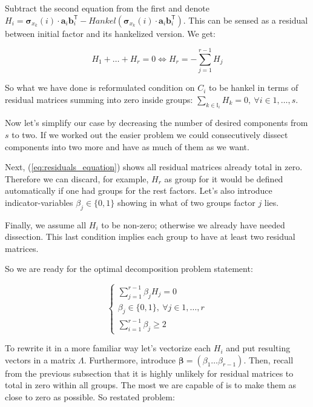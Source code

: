 \documentclass[referee, pdflatex]{sn-jnl}
\theoremstyle{definition}
\theoremstyle{plain}
\begin{document}
	Subtract the second equation from the first and denote $ H_i = \boldsymbol{\sigma}_{x_k}(i) \cdot \mathbf{a}_i  \mathbf{b}_i^{\mathsf{T}} - Hankel(\boldsymbol{\sigma}_{x_k}(i) \cdot \mathbf{a}_i  \mathbf{b}_i^{\mathsf{T}}) $. This can be sensed as a residual between initial factor and its hankelized version. We get:
	
	\begin{equation}\label{eq:residuals_equation}
		H_1 + \ldots + H_r = 0 \Leftrightarrow H_r = - \sum\limits_{j = 1}^{r - 1} H_j
	\end{equation}
	
	So what we have done is reformulated condition on $ C_i $ to be hankel in terms of residual matrices summing into zero inside groups: $ \sum_{k \in \mathbb{I}_i} H_k = 0, \  \forall i \in 1, \ldots, s $.
	
	Now let's simplify our case by decreasing the number of desired components from $ s $ to two. If we worked out the easier problem we could consecutively dissect components into two more and have as much of them as we want.  
	
	Next, (\ref{eq:residuals_equation}) shows all residual matrices already total in zero. Therefore we can discard, for example, $ H_r $ as group for it would be defined automatically if one had groups for the rest factors. Let's also introduce indicator-variables $ \beta_j \in \{0, 1\} $ showing in what of two groups factor $ j $ lies.
	
	Finally, we assume all $ H_i $ to be non-zero; otherwise we already have needed dissection. This last condition implies each group to have at least two residual matrices.
	
	So we are ready for the optimal decomposition problem statement:
	
	\begin{equation}
		\begin{cases*}
			\sum\limits_{j = 1}^{r - 1} \beta_j H_j = 0 \\
			\beta_j \in \{0, 1\}, \ \forall j \in 1, \ldots, r \\
			\sum\limits_{i = 1}^{r - 1} \beta_j \ge 2
		\end{cases*}
	\end{equation}
	
	To rewrite it in a more familiar way let's vectorize each $ H_i $ and put resulting vectors in a matrix $ \Lambda $. Furthermore, introduce $ \boldsymbol{\beta} = (\beta_1 \ldots \beta_{r-1}) $. Then, recall from the previous subsection that it is highly unlikely for residual matrices to total in zero within all groups. The most we are capable of is to make them as close to zero as possible. So restated problem:
	
\end{document}
